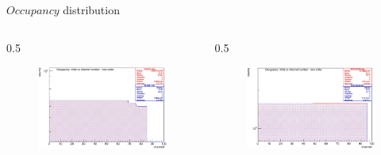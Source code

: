\documentclass{beamer}
\begin{document}
\begin{frame}{$Occupancy$ distribution}
\vspace{-4.4mm}
\begin{columns}
    \begin{column}{0.5 \framewidth}
    \begin{figure}[h!]
          \centering
          \hspace*{-2em}
        \includegraphics[width=1\columnwidth]{figures/png/Screenshot_20241013_153753.png}
          \label{fig:dfjkdsfh} 
\end{figure}    
    \end{column}
    \begin{column}{0.5 \framewidth}
           \begin{figure}[h!]
          \centering
          \hspace*{-2em}
        \includegraphics[width=1\columnwidth]{figures/png/Screenshot_20241013_153707.png}
          \label{fig:dfjkdsfh} 

\end{figure}
\end{column}
\end{columns}
\end{frame}
\end{document}
